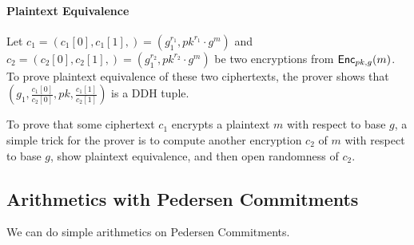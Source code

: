 \documentclass{article}
\begin{document}
\paragraph{Plaintext Equivalence}
Let $c_1=(c_1[0],c_1[1],)=(g_1^{r_1},pk^{r_1}\cdot{}g^m)$ and
$c_2=(c_2[0],c_2[1],)=(g_1^{r_2},pk^{r_2}\cdot{}g^m)$ be two
encryptions from ${\mathsf{Enc}}_{pk,g}(m)$. To prove plaintext equivalence of
these two ciphertexts, the prover shows that
$(g_1,\frac{c_1[0]}{c_2[0]},pk,\frac{c_1[1]}{c_2[1]})$ is a DDH tuple.

To prove that some ciphertext $c_1$ encrypts a plaintext $m$ with
respect to base $g$, a simple trick for the prover is to compute
another encryption $c_2$ of $m$ with respect to base $g$, show
plaintext equivalence, and then open randomness of $c_2$.

\subsection{Arithmetics with Pedersen Commitments}
We can do simple arithmetics on Pedersen Commitments.
\end{document}
